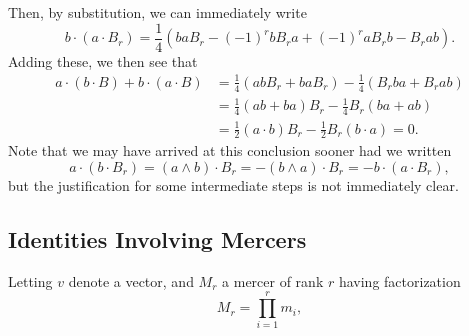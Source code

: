 \documentclass{birkjour}
\theoremstyle{definition}
\theoremstyle{remark}
\numberwithin{equation}{section}
\begin{document}
Then, by substitution, we can immediately write
\begin{equation*}
b\cdot(a\cdot B_r) = \frac{1}{4}\left(baB_r - (-1)^rbB_ra + (-1)^raB_rb - B_rab\right).
\end{equation*}
Adding these, we then see that
\begin{align*}
a\cdot (b\cdot B)+b\cdot(a\cdot B)
 &= \frac{1}{4}\left(abB_r+baB_r\right)-\frac{1}{4}\left(B_rba+B_rab\right) \\
 &= \frac{1}{4}\left(ab+ba\right)B_r-\frac{1}{4}B_r\left(ba+ab\right) \\
 &= \frac{1}{2}(a\cdot b)B_r - \frac{1}{2}B_r(b\cdot a) = 0.
\end{align*}
Note that we may have arrived at this conclusion sooner had we written
\begin{equation*}
a\cdot(b\cdot B_r) = (a\wedge b)\cdot B_r = -(b\wedge a)\cdot B_r = -b\cdot(a\cdot B_r),
\end{equation*}
but the justification for some intermediate steps is not immediately clear.

\subsection{Identities Involving Mercers}

Letting $v$ denote a vector, and $M_r$ a mercer of rank $r$ having factorization
\begin{equation}\label{equ_M_r}
M_r = \prod_{i=1}^r m_i,
\end{equation}
\end{document}
